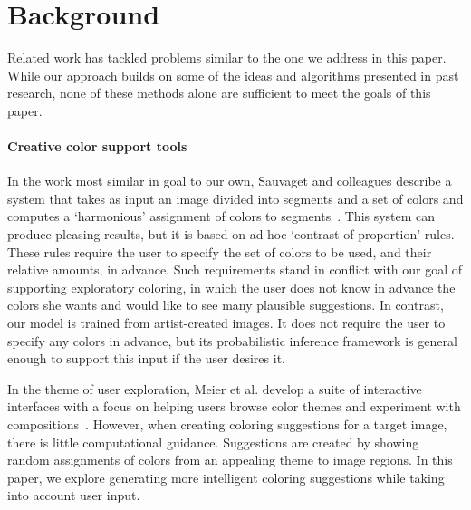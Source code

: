\section{Background}
\label{sec:background}

Related work has tackled problems similar to the one we address in this paper. While our approach builds on some of the ideas and algorithms presented in past research, none of these methods alone are sufficient to meet the goals of this paper.

\paragraph{Creative color support tools}
In the work most similar in goal to our own, Sauvaget and colleagues describe a system that takes as input an image divided into segments and a set of colors and computes a `harmonious' assignment of colors to segments~. This system can produce pleasing results, but it is based on ad-hoc `contrast of proportion' rules. These rules require the user to specify the set of colors to be used, and their relative amounts, in advance. Such requirements stand in conflict with our goal of supporting exploratory coloring, in which the user does not know in advance the colors she wants and would like to see many plausible suggestions. In contrast, our model is trained from artist-created images. It does not require the user to specify any colors in advance, but its probabilistic inference framework is general enough to support this input if the user desires it.

In the theme of user exploration, Meier et al. develop a suite of interactive interfaces with a focus on helping users browse color themes and experiment with compositions~. However, when creating coloring suggestions for a target image, there is little computational guidance. Suggestions are created by showing random assignments of colors from an appealing theme to image regions. In this paper, we explore generating more intelligent coloring suggestions while taking into account user input.

